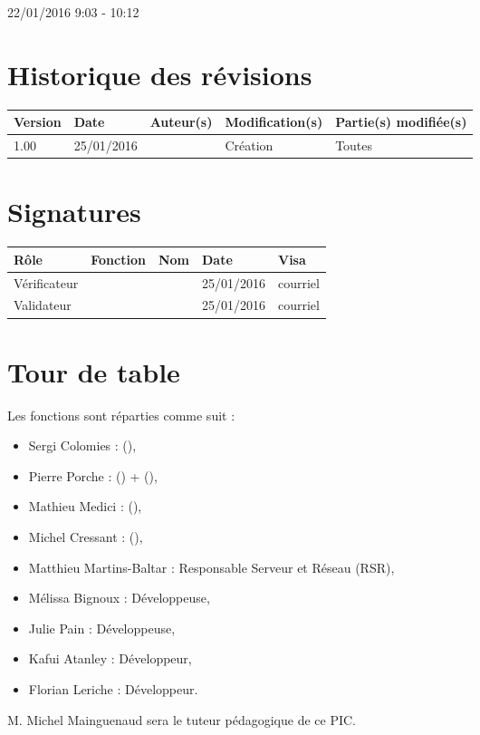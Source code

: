 \documentclass [a4paper] {article}
\begin{document}
22/01/2016			 				%
\hfill   
\hfill 	 9:03 - 10:12 				%


\section*{Historique des révisions}
\begin{center}
			\begin{tabular}{| p{2.5cm} | p{3cm} | p{3cm} | p{3cm} | p{3.5cm} |}
				\hline
				\rowcolor{Gray}
				Version & Date & Auteur(s) & Modification(s) & Partie(s) modifiée(s)		 \\
				\hline
				1.00 & 25/01/2016 & \Pierre & Création & Toutes \\
		\hline		
			\end{tabular}
		\end{center}

\section*{Signatures}

		\begin{center}
			\begin{tabular}{| p{2.5cm} | p{4cm} | p{3cm} | p{3cm} | p{2.5cm} |}
				\hline
				\rowcolor{Gray}
				Rôle & Fonction & Nom & Date & Visa		 \\
				\hline
				Vérificateur & \RQA & \Kafui & 25/01/2016 & courriel \\[30pt]
				\hline
				Validateur & \CP & \Sergi & 25/01/2016 & courriel \\[30pt]	
				\hline
			\end{tabular}
		\end{center}


\section{Tour de table}
Les fonctions sont réparties comme suit :
\begin{itemize}
	\item Sergi Colomies : \CP (\CPCourt),
	\item Pierre Porche : \RQ (\RQCourt) + \CPA (\CPACourt),
	\item Mathieu Medici : \RGC (\RGCCourt),
	\item Michel Cressant : \RD (\RDCourt),
	\item Matthieu Martins-Baltar : Responsable Serveur et Réseau (RSR),		
	\item Mélissa Bignoux : Développeuse,
	\item Julie Pain : Développeuse,
	\item Kafui Atanley : Développeur,
	\item Florian Leriche : Développeur.


\end{itemize}
M. Michel Mainguenaud sera le tuteur pédagogique de ce PIC.
\end{document}
